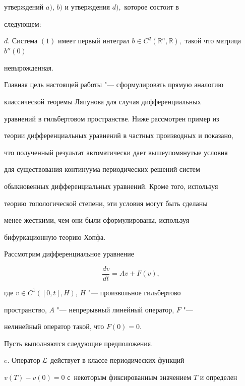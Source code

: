 утверждений $a)$, $b)$ и утверждения $d),$ которое состоит в

следующем:



$d.$ Система $(1)$ имеет первый интеграл $b\in

C^2(\mathbb{R}^n, \mathbb{R}),$ такой что матрица $b''(0)$

невырожденная.



Главная цель настоящей работы  "---  сформулировать прямую аналогию

классической теоремы Ляпунова для случая дифференциальных

уравнений в гильбертовом пространстве. Ниже рассмотрен пример из

теории дифференциальных уравнений в частных производных и показано,

что полученный результат автоматически дает вышеупомянутые условия

для существования континуума периодических решений систем

обыкновенных дифференциальных уравнений. Кроме того, используя

теорию топологической степени, эти условия могут быть сделаны

менее жесткими, чем они были сформулированы, используя

бифуркационную теорию Хопфа.




Рассмотрим дифференциальное уравнение

\begin{equation}

\label{fedotova:e6} \displaystyle\frac{dv}{dt}=Av+F(v),

\end{equation}

где $v\in C^1([0, t], H)$, $H$  "---  произвольное гильбертово

пространство, $A$  "---  непрерывный линейный оператор, $F$  "--- 

нелинейный оператор такой, что $F(0)=0.$



Пусть выполняются следующие предположения.



$e.$ Оператор ${\cal L}$ действует в классе периодических функций

\mbox{$v(T)-v(0)=0$} с~некоторым фиксированным значением $T$ и определен

